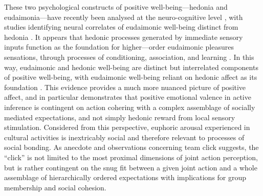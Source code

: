 \begin{mccorrection}
These two psychological constructs of positive well-being---hedonia and eudaimonia---have recently been analysed at the neuro-cognitive level \citep{Berridge2011}, with studies identifying neural correlates of eudaimonic well-being distinct from hedonia \citep{Lewis2014}. It appears that hedonic processes generated by immediate sensory inputs function as the foundation for higher—order eudaimonic pleasures sensations, through processes of conditioning, association, and learning \citep{Berridge2003}.  In this way, eudaimonic and hedonic well-being are distinct but interrelated components of positive well-being, with eudaimonic well-being reliant on hedonic affect as its foundation \citep{Berridge2011}. This evidence provides a much more nuanced picture of positive affect, and in particular demonstrates that positive emotional valence in active inference is contingent on action cohering with a complex assemblage of socially mediated expectations, and not simply hedonic reward from local sensory stimulation.  Considered from this perspective, euphoric arousal experienced in cultural activities is inextricably social and therefore relevant to processes of social bonding.
As anecdote and observations concerning team click suggests, the ``click'' is not limited to the most proximal dimensions of joint action perception, but is rather contingent on the snug fit between a given joint action and a whole assemblage of hierarchically ordered expectations with implications for group membership and social cohesion.
\end{mccorrection}


